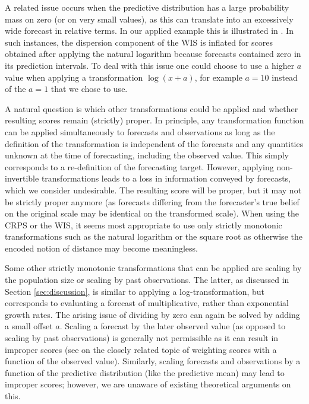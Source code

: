\documentclass[10pt,letterpaper]{article}
\begin{document}
A related issue occurs when the predictive distribution has a large probability mass on zero (or on very small values), as this can translate into an excessively wide forecast in relative terms. In our applied example this is illustrated in . In such instances, the dispersion component of the WIS is inflated for scores obtained after applying the natural logarithm because forecasts contained zero in its prediction intervals. To deal with this issue one could choose to use a higher $a$ value when applying a transformation $\log(x + a)$, for example $a = 10$ instead of the $a = 1$ that we chose to use.

A natural question is which other transformations could be applied and whether resulting scores remain (strictly) proper. In principle, any transformation function can be applied simultaneously to forecasts and observations as long as the definition of the transformation is independent of the forecasts and any quantities unknown at the time of forecasting, including the observed value. This simply corresponds to a re-definition of the forecasting target. However, applying non-invertible transformations leads to a loss in information conveyed by forecasts, which we consider undesirable. The resulting score will be proper, but it may not be strictly proper anymore (as forecasts differing from the forecaster's true belief on the original scale may be identical on the transformed scale). When using the CRPS or the WIS, it seems most appropriate to use only strictly monotonic transformations such as the natural logarithm or the square root as otherwise the encoded notion of distance may become meaningless. 

Some other strictly monotonic transformations that can be applied are scaling by the population size or scaling by past observations. The latter, as discussed in Section \ref{sec:discussion}, is similar to applying a log-transformation, but corresponds to evaluating a forecast of multiplicative, rather than exponential growth rates. The arising issue of dividing by zero can again be solved by adding a small offset $a$. Scaling a forecast by the later observed value (as opposed to scaling by past observations) is generally not permissible as it can result in improper scores (see \cite{lerchForecasterDilemmaExtreme2015} on the closely related topic of weighting scores with a function of the observed value). Similarly, scaling forecasts and observations by a function of the predictive distribution (like the predictive mean) may lead to improper scores; however, we are unaware of existing theoretical arguments on this. 
\end{document}
